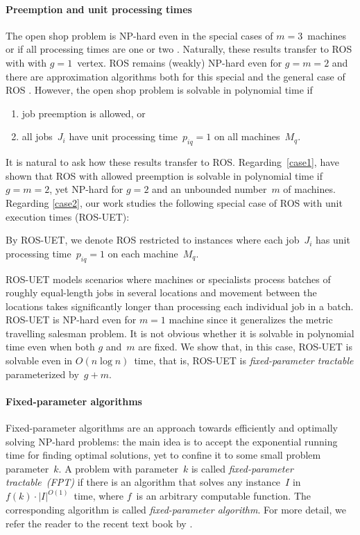 \documentclass[natbib,sort,smallextended,envcountsame,envcountsect,numbook]{svjour3}
\newcommand{\ROS}{\textsc{ROS}}
\newcommand{\ROSUPT}{\textsc{ROS-UET}}
\newcommand{\nmach}{m}
\newcommand{\nverts}{g}
\begin{document}
\paragraph{Preemption and unit processing times} 
The open shop problem is NP-hard even in the special cases
of $\nmach=3$~machines \citep{GS76} or if all processing times are one or two \citep{KSS12}.
Naturally, these results transfer to \ROS{} with
with $\nverts=1$~vertex.
\ROS{} remains (weakly) NP-hard
even for $\nverts=\nmach=2$ \citep{ABC06}
and there are approximation algorithms
both for this special and the general case of \ROS{}
\citep{ABC05,YLWF11,CKS13,Kon15}.
However, the open shop problem is solvable in polynomial time if
\begin{enumerate}[(1)]
\item\label{case1}job preemption is allowed, or
\item\label{case2}all jobs~$J_i$ have unit processing time~$p_{iq}=1$  on all machines~$M_q$.
\end{enumerate}

\noindent
It is natural to ask how these results
transfer to \ROS{}.
Regarding~\eqref{case1},
\citet{PCh12} have shown that
\ROS{} with allowed preemption
is solvable in polynomial time
if $\nverts=\nmach=2$,
yet NP-hard for $\nverts=2$ and
an unbounded number~$\nmach$ of machines.
Regarding \eqref{case2}, our work studies
the following special case of \ROS{} with unit execution times (\ROSUPT):

\begin{problem}
  By \ROSUPT{}, we denote \ROS{} restricted to instances
  where each job~$J_i$ has unit processing time~$p_{iq}=1$ on each
  machine~$M_q$.
\end{problem}

\noindent
\ROSUPT{} models scenarios where machines or specialists
process batches of roughly equal-length jobs
in several locations and
movement between the locations
takes significantly longer
than processing each individual job in a batch.
\ROSUPT{} is NP-hard even for $\nmach=1$ machine
since it generalizes the metric travelling salesman problem.
It is not obvious whether it is solvable in polynomial time
even when both \(\nverts\) and~\(\nmach\) are fixed.
We show that, in this case,
\ROSUPT{} is solvable even in \(O(n\log n)\)~time, that is, \ROSUPT{} is
\emph{fixed-parameter tractable} parameterized by~\(g+m\).


\paragraph{Fixed-parameter algorithms}
Fixed-parameter algorithms are an approach towards
efficiently and optimally solving NP-hard problems:
the main idea is to accept the exponential running time
for finding optimal solutions,
yet to confine it
to some small problem parameter~$k$.
A problem with parameter~$k$
is called \emph{fixed-parameter tractable~(FPT)}
if there is an algorithm that solves any instance~$I$
in $f(k)\cdot|I|^{O(1)}$~time,
where $f$~is an arbitrary computable function.
The corresponding algorithm is called \emph{fixed-parameter algorithm}.  
For more detail,
we refer the reader to the recent text book by \citet{CFK+15}.
\end{document}
